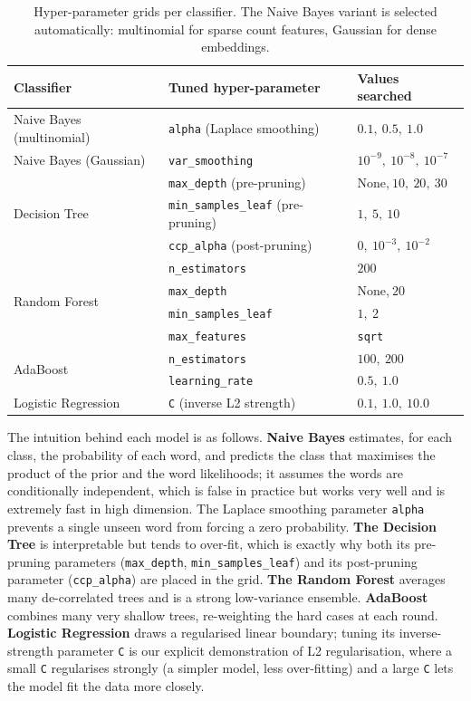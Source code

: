 \documentclass[11pt,a4paper]{article}
\begin{document}
\begin{table}[H]
\centering
\small
\begin{tabular}{lll}
\toprule
\textbf{Classifier} & \textbf{Tuned hyper-parameter} & \textbf{Values searched} \\
\midrule
Naive Bayes (multinomial) & \texttt{alpha} (Laplace smoothing) & $0.1,\ 0.5,\ 1.0$ \\
Naive Bayes (Gaussian) & \texttt{var\_smoothing} & $10^{-9},\ 10^{-8},\ 10^{-7}$ \\
\midrule
\multirow{3}{*}{Decision Tree} & \texttt{max\_depth} (pre-pruning) & None,$\ 10,\ 20,\ 30$ \\
 & \texttt{min\_samples\_leaf} (pre-pruning) & $1,\ 5,\ 10$ \\
 & \texttt{ccp\_alpha} (post-pruning) & $0,\ 10^{-3},\ 10^{-2}$ \\
\midrule
\multirow{4}{*}{Random Forest} & \texttt{n\_estimators} & $200$ \\
 & \texttt{max\_depth} & None,$\ 20$ \\
 & \texttt{min\_samples\_leaf} & $1,\ 2$ \\
 & \texttt{max\_features} & \texttt{sqrt} \\
\midrule
\multirow{2}{*}{AdaBoost} & \texttt{n\_estimators} & $100,\ 200$ \\
 & \texttt{learning\_rate} & $0.5,\ 1.0$ \\
\midrule
Logistic Regression & \texttt{C} (inverse L2 strength) & $0.1,\ 1.0,\ 10.0$ \\
\bottomrule
\end{tabular}
\caption{Hyper-parameter grids per classifier. The Naive Bayes variant is selected
automatically: multinomial for sparse count features, Gaussian for dense embeddings.}
\label{tab:grids}
\end{table}

The intuition behind each model is as follows. \textbf{Naive Bayes} estimates, for each
class, the probability of each word, and predicts the class that maximises the product
of the prior and the word likelihoods; it assumes the words are conditionally
independent, which is false in practice but works very well and is extremely fast in
high dimension. The Laplace smoothing parameter \texttt{alpha} prevents a single unseen
word from forcing a zero probability. \textbf{The Decision Tree} is interpretable but
tends to over-fit, which is exactly why both its pre-pruning parameters
(\texttt{max\_depth}, \texttt{min\_samples\_leaf}) and its post-pruning parameter
(\texttt{ccp\_alpha}) are placed in the grid. \textbf{The Random Forest} averages many
de-correlated trees and is a strong low-variance ensemble. \textbf{AdaBoost} combines
many very shallow trees, re-weighting the hard cases at each round. \textbf{Logistic
Regression} draws a regularised linear boundary; tuning its inverse-strength parameter
\texttt{C} is our explicit demonstration of L2 regularisation, where a small \texttt{C}
regularises strongly (a simpler model, less over-fitting) and a large \texttt{C} lets
the model fit the data more closely.
\end{document}
